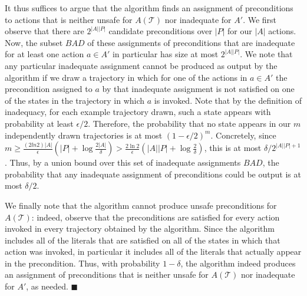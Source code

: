 \documentclass[letterpaper]{article}
\newenvironment{proof}{\noindent{\bf Proof:~~}}{\qed}
\newcommand{\qed}{\hfill\ensuremath{\blacksquare}}
\begin{document}
\begin{proof}
It thus suffices to argue that the algorithm finds an assignment of preconditions to actions that is neither unsafe for $A(\mathcal{T})$ nor inadequate for $A'$. We first observe that there are $2^{|A||P|}$ candidate preconditions over $|P|$ for our $|A|$ actions. Now, the subset $BAD$ of these assignments of preconditions that are inadequate for at least one action $a\in A'$ in particular has size at most $2^{|A||P|}$. We note that any particular inadequate assignment cannot be produced as output by the algorithm if we draw a trajectory in which for one of the actions in $a\in A'$ the precondition assigned to $a$ by that inadequate assignment is not satisfied on one of the states in the trajectory in which $a$ is invoked. Note that by the definition of inadequacy, for each example trajectory drawn, such a state appears with probability at least $\epsilon/2$. Therefore, the probability that no state appears in our $m$ independently drawn trajectories is at most $(1-\epsilon/2)^m$. Concretely, since $m\geq\frac{(2ln 2)|A|}{\epsilon}(|P|+\log\frac{2|A|}{\delta})>\frac{2\ln 2}{\epsilon}(|A||P|+\log\frac{2}{\delta})$, this is at most $\delta/2^{|A||P|+1}$. Thus, by a union bound over this set of inadequate assignments $BAD$, the probability that any inadequate assignment of preconditions could be output is at most $\delta/2$.



We finally note that the algorithm cannot produce unsafe preconditions for $A(\mathcal{T})$: indeed, observe that the preconditions are satisfied for every action invoked in every trajectory obtained by the algorithm. Since the algorithm includes all of the literals that are satisfied on all of the states in which that action was invoked, in particular it includes all of the literals that actually appear in the precondition. Thus, with probability $1-\delta$, the algorithm indeed produces an assignment of preconditions that is neither unsafe for $A(\mathcal{T})$ nor inadequate for $A'$, as needed.
\end{proof}
\end{document}
